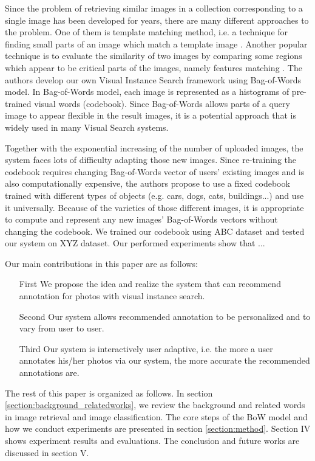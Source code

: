 Since the problem of retrieving similar images in a collection corresponding to a single image has been developed for years, there are many different approaches to the problem. One of them is template matching method, i.e. a technique for finding small parts of an image which match a template image \cite{brunelli_template_matching,Rosenfeld4309663,Gharavi913587}. Another popular technique is to evaluate the similarity of two images by comparing some regions which appear to be critical parts of the images, namely features matching \cite{Belongie710790,Rubner,Viola990517}. The authors develop our own Visual Instance Search framework using Bag-of-Words model. In Bag-of-Words model, each image is represented as a histograms of pre-trained visual words (codebook). Since Bag-of-Words allows parts of a query image to appear flexible in the result images, it is a potential approach that is widely used in many Visual Search systems. 

Together with the exponential increasing of the number of uploaded images, the system faces lots of difficulty adapting those new images. Since re-training the codebook requires changing Bag-of-Words vector of users' existing images and is also computationally expensive, the authors propose to use a fixed codebook trained with different types of objects (e.g. cars, dogs, cats, buildings...) and use it universally. Because of the varieties of those different images, it is appropriate to compute and represent any new images' Bag-of-Words vectors without changing the codebook. We trained our codebook using ABC dataset and tested our system on XYZ dataset. Our performed experiments show that ...

Our main contributions in this paper are as follows:
\begin{enumerate}
	\item[First] We propose the idea and realize the system that can recommend annotation for photos with visual instance search.
	\item[Second] Our system allows recommended annotation to be personalized and to vary from user to user.
	\item[Third] Our system is interactively user adaptive, i.e. the more a user annotates his/her photos via our system, the more accurate the recommended annotations are.
\end{enumerate}

The rest of this paper is organized as follows. In section \ref{section:background_relatedworks}, we review the background and related words in image retrieval and image classification. The core steps of the BoW model and how we conduct experiments are presented in section \ref{section:method}. Section IV shows experiment results and evaluations. The conclusion and future works are discussed in section V.
